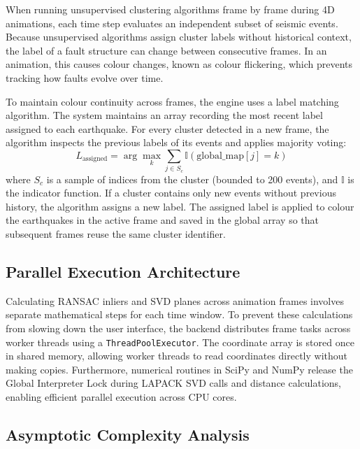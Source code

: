When running unsupervised clustering algorithms frame by frame during 4D animations, each time step evaluates an independent subset of seismic events. Because unsupervised algorithms assign cluster labels without historical context, the label of a fault structure can change between consecutive frames. In an animation, this causes colour changes, known as colour flickering, which prevents tracking how faults evolve over time.

To maintain colour continuity across frames, the engine uses a label matching algorithm. The system maintains an array recording the most recent label assigned to each earthquake. For every cluster detected in a new frame, the algorithm inspects the previous labels of its events and applies majority voting:
\begin{equation}
    L_\text{assigned} = \arg\max_k \sum_{j \in S_c} \mathbb{I}(\text{global\_map}[j] = k)
    \label{eq:majority-voting}
\end{equation}
where $S_c$ is a sample of indices from the cluster (bounded to 200 events), and $\mathbb{I}$ is the indicator function. If a cluster contains only new events without previous history, the algorithm assigns a new label. The assigned label is applied to colour the earthquakes in the active frame and saved in the global array so that subsequent frames reuse the same cluster identifier.

\subsection{Parallel Execution Architecture}

Calculating RANSAC inliers and SVD planes across animation frames involves separate mathematical steps for each time window. To prevent these calculations from slowing down the user interface, the backend distributes frame tasks across worker threads using a \texttt{ThreadPoolExecutor}. The coordinate array is stored once in shared memory, allowing worker threads to read coordinates directly without making copies. Furthermore, numerical routines in SciPy and NumPy release the Global Interpreter Lock during LAPACK SVD calls and distance calculations, enabling efficient parallel execution across CPU cores.

\newpage
\subsection{Asymptotic Complexity Analysis}


